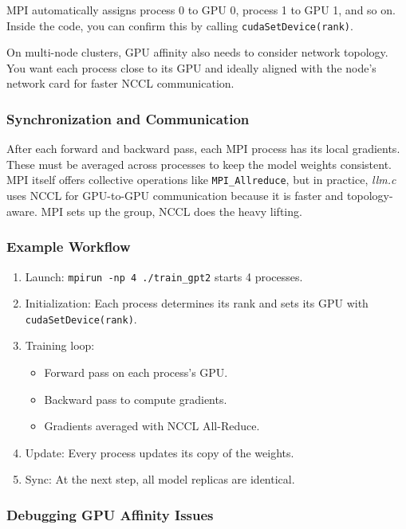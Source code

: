\documentclass[
  letterpaper,
  DIV=11,
  numbers=noendperiod]{scrreprt}
\providecommand{\tightlist}{%
  \setlength{\itemsep}{0pt}\setlength{\parskip}{0pt}}
\begin{document}
MPI automatically assigns process 0 to GPU 0, process 1 to GPU 1, and so
on. Inside the code, you can confirm this by calling
\texttt{cudaSetDevice(rank)}.

On multi-node clusters, GPU affinity also needs to consider network
topology. You want each process close to its GPU and ideally aligned
with the node's network card for faster NCCL communication.

\subsubsection{Synchronization and
Communication}\label{synchronization-and-communication}

After each forward and backward pass, each MPI process has its local
gradients. These must be averaged across processes to keep the model
weights consistent. MPI itself offers collective operations like
\texttt{MPI\_Allreduce}, but in practice, \emph{llm.c} uses NCCL for
GPU-to-GPU communication because it is faster and topology-aware. MPI
sets up the group, NCCL does the heavy lifting.

\subsubsection{Example Workflow}\label{example-workflow}

\begin{enumerate}
\def\labelenumi{\arabic{enumi}.}
\item
  Launch: \texttt{mpirun\ -np\ 4\ ./train\_gpt2} starts 4 processes.
\item
  Initialization: Each process determines its rank and sets its GPU with
  \texttt{cudaSetDevice(rank)}.
\item
  Training loop:

  \begin{itemize}
  \tightlist
  \item
    Forward pass on each process's GPU.
  \item
    Backward pass to compute gradients.
  \item
    Gradients averaged with NCCL All-Reduce.
  \end{itemize}
\item
  Update: Every process updates its copy of the weights.
\item
  Sync: At the next step, all model replicas are identical.
\end{enumerate}

\subsubsection{Debugging GPU Affinity
Issues}\label{debugging-gpu-affinity-issues}
\end{document}
